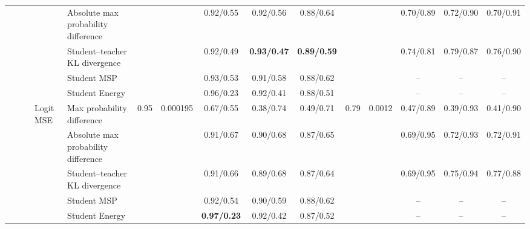 \documentclass[border=2pt]{standalone}
\begin{document}
\begin{tabular}{lllllcccccccccc}
 &  &  &  & Absolute max probability difference &  &  & 0.92/0.55 & 0.92/0.56 & 0.88/0.64 &  &  & 0.70/0.89 & 0.72/0.90 & 0.70/0.91 \\
 &  &  &  & Student--teacher KL divergence &  &  & 0.92/0.49 & \textbf{0.93/0.47} & \textbf{0.89/0.59} &  &  & 0.74/0.81 & 0.79/0.87 & 0.76/0.90 \\
 &  &  &  & Student MSP &  &  & 0.93/0.53 & 0.91/0.58 & 0.88/0.62 &  &  & -- & -- & -- \\
 &  &  &  & Student Energy &  &  & 0.96/0.23 & 0.92/0.41 & 0.88/0.51 &  &  & -- & -- & -- \\
 &  &  & Logit MSE & Max probability difference & 0.95 & 0.000195 & 0.67/0.55 & 0.38/0.74 & 0.49/0.71 & 0.79 & 0.0012 & 0.47/0.89 & 0.39/0.93 & 0.41/0.90 \\
 &  &  &  & Absolute max probability difference &  &  & 0.91/0.67 & 0.90/0.68 & 0.87/0.65 &  &  & 0.69/0.95 & 0.72/0.93 & 0.72/0.91 \\
 &  &  &  & Student--teacher KL divergence &  &  & 0.91/0.66 & 0.89/0.68 & 0.87/0.64 &  &  & 0.69/0.95 & 0.75/0.94 & 0.77/0.88 \\
 &  &  &  & Student MSP &  &  & 0.92/0.54 & 0.90/0.59 & 0.88/0.62 &  &  & -- & -- & -- \\
 &  &  &  & Student Energy &  &  & \textbf{0.97/0.23} & 0.92/0.42 & 0.87/0.52 &  &  & -- & -- & -- \\
\bottomrule
\end{tabular}
\end{document}
